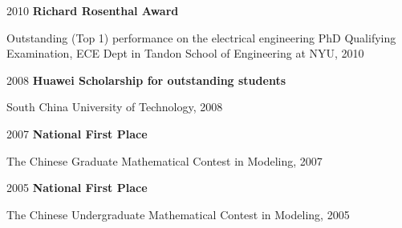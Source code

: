         \begin{twocolentry}{2010}
        \textbf{Richard Rosenthal Award}\end{twocolentry}
        \vspace{0.10 cm}
        \begin{onecolentry}
            \begin{highlights}
                \item Outstanding (Top 1) performance on the electrical engineering PhD Qualifying Examination, ECE Dept in Tandon School of Engineering at NYU, 2010
            \end{highlights}
        \end{onecolentry}
        \vspace{0.20 cm}

        \begin{twocolentry}{2008}
        \textbf{Huawei Scholarship for outstanding students}\end{twocolentry}
        \vspace{0.20 cm}
        \begin{onecolentry}
            \begin{highlights}
                \item South China University of Technology, 2008
            \end{highlights}
        \end{onecolentry}
        \vspace{0.20 cm}
        
        \begin{twocolentry}{2007}
        \textbf{National First Place}\end{twocolentry}
        \vspace{0.10 cm}
        \begin{onecolentry}
            \begin{highlights}
                \item The Chinese Graduate Mathematical Contest in Modeling, 2007
            \end{highlights}
        \end{onecolentry}
        \vspace{0.20 cm}

                \begin{twocolentry}{2005}
        \textbf{National First Place}\end{twocolentry}
        \vspace{0.10 cm}
        \begin{onecolentry}
            \begin{highlights}
                \item The Chinese Undergraduate Mathematical Contest in Modeling, 2005
            \end{highlights}
        \end{onecolentry}
        \vspace{0.20 cm}
